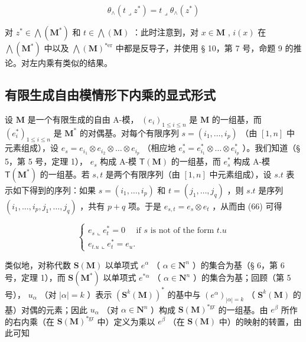 \[
\theta_ {\wedge} (t \lrcorner z ^ {*}) = t \lrcorner \theta_ {\wedge} (z ^ {*})\tag{71}
\]

对 \(z^{*} \in \bigwedge(\mathbf{M}^{*})\) 和 \(t \in \bigwedge(\mathbf{M})\) ：此时注意到，对 \(x \in \mathbf{M}\) , \(i(x)\) 在 \(\bigwedge(\mathbf{M}^{*})\) 中以及 \(\bigwedge(\mathbf{M})^{*\text{er}}\) 中都是反导子，并使用 § 10，第 7 号，命题 9 的推论。对左内乘有类似的结果。

\subsection{有限生成自由模情形下内乘的显式形式}

设 \(\mathbf{M}\) 是一个有限生成的自由 A-模， \((e_i)_{1\leq i\leq n}\) 是 \(\mathbf{M}\) 的一组基，而 \((e_i^*)_{1\leq i\leq n}\) 是 \(\mathbf{M}^*\) 的对偶基。对每个有限序列 \(s = (i_1,\ldots ,i_p)\) （由 \([1,n]\) 中元素组成），设 \(e_s = e_{i_1}\otimes e_{i_2}\otimes \dots \otimes e_{i_p}\) （相应地 \(e_s^* = e_{i_1}^*\otimes \dots \otimes e_{i_p}^*\) ）。我们知道（§ 5，第 5 号，定理 1）， \(e_s\) 构成 A-模 \(\mathsf{T}(\mathbf{M})\) 的一组基，而 \(e_s^*\) 构成 A-模 \(\mathsf{T}(\mathbf{M}^*)\) 的一组基。若 \(s,t\) 是两个有限序列（由 \([1,n]\) 中元素组成），设 \(s.t\) 表示如下得到的序列：如果 \(s = (i_1,\ldots ,i_p)\) 和 \(t = (j_1,\ldots ,j_q)\) ，则 \(s.t\) 是序列 \((i_1,\ldots ,i_p,j_1,\ldots ,j_q)\) ，共有 \(p + q\) 项。于是 \(e_{s,t} = e_s\otimes e_t\) ，从而由 (66) 可得

\[
\left\{ \begin{array}{l} e _ {s} \llcorner e _ {t} ^ {*} = 0 \quad \text { if   } s \text {   is   not   of   the   form   } t. u \\ e _ {t. u} \llcorner e _ {t} ^ {*} = e _ {u}. \end{array} \right.\tag{72}
\]

类似地，对称代数 \(\mathbf{S}(\mathbf{M})\) 以单项式 \(e^{\alpha}\) （ \(\alpha \in \mathbf{N}^{n}\) ）的集合为基（§ 6，第 6 号，定理 1），而 \(\mathbf{S}(\mathbf{M}^{*})\) 以单项式 \(e^{*\alpha}\) （ \(\alpha \in \mathbf{N}^{n}\) ）的集合为基；回顾（第 5 号）， \(u_{\alpha}\) （对 \(|\alpha| = k\) ）表示 \((\mathbf{S}^{k}(\mathbf{M}))^{*}\) 的基中与 \((e^{\alpha})_{|\alpha| = k}\) （ \(\mathbf{S}^{k}(\mathbf{M})\) 的基）对偶的元素；因此 \(u_{\alpha}\) （对 \(\alpha \in \mathbf{N}^{n}\) ）构成 \(\mathbf{S}(\mathbf{M})^{*\mathrm{gr}}\) 的一组基。由 \(e^{\beta}\) 所作的右内乘（在 \(\mathbf{S}(\mathbf{M})^{*\mathrm{gr}}\) 中）定义为乘以 \(e^{\beta}\) （在 \(\mathbf{S}(\mathbf{M})\) 中）的映射的转置，由此可知

